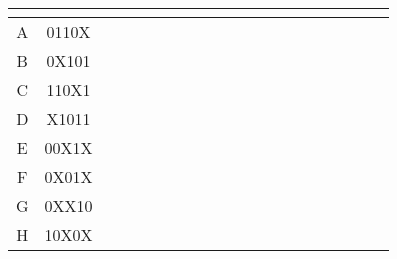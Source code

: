 \documentclass{article}
\begin{document}
\begin{flushleft}
\begin{tabular}{|c|c|r*{17}{|c}|}
     &  &  &  &  &  &  &  &  &  &  &  &  &  &  &  &  & \\ \hline
    A & 0110X&\makecell{ }&\makecell{ }&\makecell{ }&\makecell{ }&\makecell{ }&&&\makecell{ }&\makecell{ }&\makecell{ }&\makecell{ }&\makecell{ }&\makecell{ }&\makecell{ }&\makecell{ }&\makecell{ }&\makecell{ }\\ \hline
    B & 0X101&\makecell{ }&&\makecell{ }&\makecell{ }&\makecell{ }&\makecell{ }&&\makecell{ }&\makecell{ }&\makecell{ }&\makecell{ }&\makecell{ }&\makecell{ }&\makecell{ }&\makecell{ }&\makecell{ }&\makecell{ }\\ \hline
    C & 110X1&\makecell{ }&\makecell{ }&\makecell{ }&\makecell{ }&\makecell{ }&\makecell{ }&\makecell{ }&\makecell{ }&\makecell{ }&\makecell{ }&\makecell{ }&\makecell{ }&\makecell{ }&&&\makecell{ }&\makecell{ }\\ \hline
    D & X1011&\makecell{ }&\makecell{ }&\makecell{ }&\makecell{ }&&\makecell{ }&\makecell{ }&\makecell{ }&\makecell{ }&\makecell{ }&\makecell{ }&\makecell{ }&\makecell{ }&\makecell{ }&&\makecell{ }&\makecell{ }\\ \hline
    E & 00X1X&&\makecell{ }&&&\makecell{ }&\makecell{ }&\makecell{ }&\makecell{ }&\makecell{ }&\makecell{ }&\makecell{ }&\makecell{ }&\makecell{ }&\makecell{ }&\makecell{ }&\makecell{ }&\makecell{ }\\ \hline
    F & 0X01X&&\makecell{ }&\makecell{ }&\makecell{ }&&\makecell{ }&\makecell{ }&\makecell{ }&\makecell{ }&\makecell{ }&\makecell{ }&\makecell{ }&\makecell{ }&\makecell{ }&\makecell{ }&\makecell{ }&\makecell{ }\\ \hline
    G & 0XX10&&\makecell{ }&&\makecell{ }&\makecell{ }&\makecell{ }&\makecell{ }&&\makecell{ }&\makecell{ }&\makecell{ }&\makecell{ }&\makecell{ }&\makecell{ }&\makecell{ }&\makecell{ }&\makecell{ }\\ \hline
    H & 10X0X&\makecell{ }&\makecell{ }&\makecell{ }&\makecell{ }&\makecell{ }&\makecell{ }&\makecell{ }&\makecell{ }&&&&\makecell{ }&\makecell{ }&\makecell{ }&\makecell{ }&\makecell{ }&\makecell{ }\\ \hline

\end{tabular}
\end{flushleft}
\end{document}
